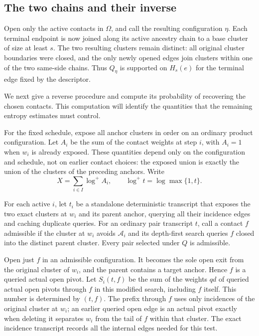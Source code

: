 \documentclass[11pt]{article}
\theoremstyle{definition}
\begin{document}
\subsection{The two chains and their inverse}

Open only the active contacts in $\Omega$, and call the resulting
configuration $\eta$. Each terminal endpoint is now joined along its
active ancestry chain to a base cluster of size at least $s$. The two
resulting clusters remain distinct: all original cluster boundaries were
closed, and the only newly opened edges join clusters within one of the
two same-side chains. Thus $Q_\eta$ is supported on $H_s(e)$ for the
terminal edge fixed by the descriptor.

We next give a reverse procedure and compute its probability of recovering
the chosen contacts. This computation will identify the quantities that
the remaining entropy estimates must control.

For the fixed schedule, expose all anchor clusters in order on an
ordinary product configuration. Let $A_i$ be the sum of the contact
weights at step $i$, with $A_i=1$ when $w_i$ is already exposed. These
quantities depend only on the configuration and schedule, not on earlier
contact choices: the exposed union is exactly the union of the clusters
of the preceding anchors. Write
\[
 X=\sum_{i\in I}\log^+A_i,
 \qquad \log^+t=\log\max\{1,t\}.
\]

For each active $i$, let $t_i$ be a standalone deterministic transcript
that exposes the two exact clusters at $w_i$ and its parent anchor,
querying all their incidence edges and caching duplicate queries.
For an ordinary pair transcript $t$, call a contact $f$ admissible if
the cluster at $w_i$ avoids $\mathcal A_i$ and its depth-first search
queries $f$ closed into the distinct parent cluster. Every pair selected
under $Q$ is admissible.

Open just $f$ in an admissible configuration. It becomes the sole open
exit from the original cluster of $w_i$, and the parent contains a target
anchor. Hence $f$ is a queried actual open pivot. Let $S_i(t,f)$ be the
sum of the weights $qd$ of queried actual open pivots through $f$ in this
modified search, including $f$ itself. This number is determined by
$(t,f)$. The prefix through $f$ uses only incidences of the original
cluster at $w_i$; an earlier queried open edge is an actual pivot exactly
when deleting it separates $w_i$ from the tail of $f$ within that cluster.
The exact incidence transcript records all the internal edges needed for
this test.
\end{document}
